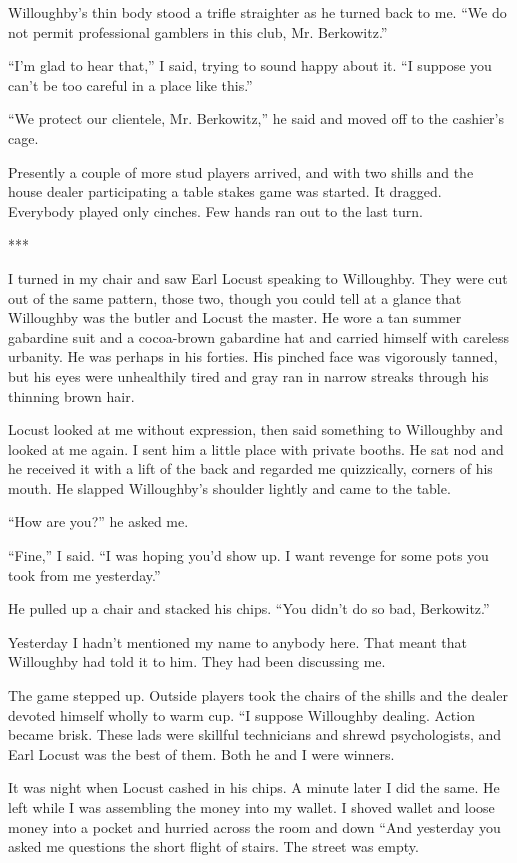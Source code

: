 {Willoughby’s thin body stood a trifle straighter as he turned back to me. “We do not permit professional gamblers in this club, Mr. Berkowitz.”

“I’m glad to hear that,” I said, trying to sound happy about it. “I suppose you can’t be too careful in a place like this.”

“We protect our clientele, Mr. Berkowitz,” he said and moved off to the cashier’s cage.

Presently a couple of more stud players arrived, and with two shills and the house dealer participating a table stakes game was started. It dragged. Everybody played only cinches. Few hands ran out to the last turn.

***

I turned in my chair and saw Earl Locust speaking to Willoughby. They were cut out of the same pattern, those two, though you could tell at a glance that Willoughby was the butler and Locust the master. He wore a tan summer gabardine suit and a cocoa-brown gabardine hat and carried himself with careless urbanity. He was perhaps in his forties. His pinched face was vigorously tanned, but his eyes were unhealthily tired and gray ran in narrow streaks through his thinning brown hair.

Locust looked at me without expression, then said something to Willoughby and looked at me again. I sent him a little place with private booths. He sat nod and he received it with a lift of the back and regarded me quizzically, corners of his mouth. He slapped Willoughby’s shoulder lightly and came to the table.

“How are you?” he asked me.

“Fine,” I said. “I was hoping you’d show up. I want revenge for some pots you took from me yesterday.”

He pulled up a chair and stacked his chips. “You didn’t do so bad, Berkowitz.”

Yesterday I hadn’t mentioned my name to anybody here. That meant that Willoughby had told it to him. They had been discussing me.

The game stepped up. Outside players took the chairs of the shills and the dealer devoted himself wholly to warm cup. “I suppose Willoughby dealing. Action became brisk. These lads were skillful technicians and shrewd psychologists, and Earl Locust was the best of them. Both he and I were winners.

It was night when Locust cashed in his chips. A minute later I did the same. He left while I was assembling the money into my wallet. I shoved wallet and loose money into a pocket and hurried across the room and down “And yesterday you asked me questions the short flight of stairs. The street was empty.

}
